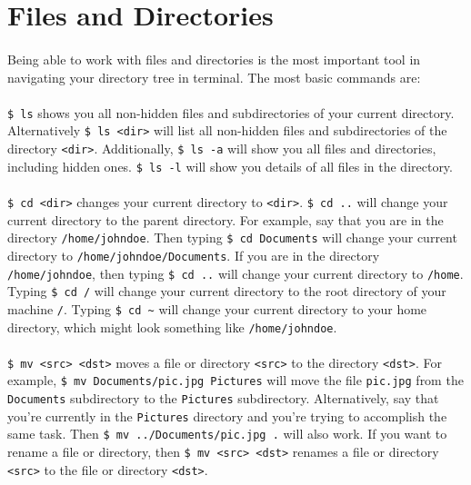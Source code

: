 \documentclass{article}
\begin{document}
\section{Files and Directories}

\paragraph{} Being able to work with files and directories is the most important tool in navigating your directory tree in terminal. The most basic commands are:

\paragraph{} \texttt{\$ ls} shows you all non-hidden files and subdirectories of your current directory. Alternatively \texttt{\$ ls <dir>} will list all non-hidden files and subdirectories of the directory \texttt{<dir>}. Additionally, \texttt{\$ ls -a} will show you all files and directories, including hidden ones. \texttt{\$ ls -l} will show you details of all files in the directory.

\paragraph{} \texttt{\$ cd <dir>} changes your current directory to \texttt{<dir>}. \texttt{\$ cd ..} will change your current directory to the parent directory. For example, say that you are in the directory \texttt{/home/johndoe}. Then typing \texttt{\$ cd Documents} will change your current directory to \texttt{/home/johndoe/Documents}. If you are in the directory \texttt{/home/johndoe}, then typing \texttt{\$ cd ..} will change your current directory to \texttt{/home}. Typing \texttt{\$ cd /} will change your current directory to the root directory of your machine \texttt{/}. Typing \texttt{\$ cd \~} will change your current directory to your home directory, which might look something like \texttt{/home/johndoe}.

\paragraph{} \texttt{\$ mv <src> <dst>} moves a file or directory \texttt{<src>} to the directory \texttt{<dst>}. For example, \texttt{\$ mv Documents/pic.jpg Pictures} will move the file \texttt{pic.jpg} from the \texttt{Documents} subdirectory to the \texttt{Pictures} subdirectory. Alternatively, say that you're currently in the \texttt{Pictures} directory and you're trying to accomplish the same task. Then \texttt{\$ mv ../Documents/pic.jpg .} will also work. If you want to rename a file or directory, then \texttt{\$ mv <src> <dst>} renames a file or directory \texttt{<src>} to the file or directory \texttt{<dst>}.
\end{document}
